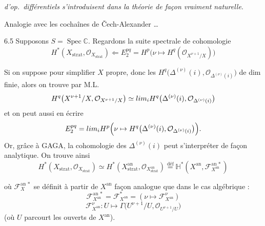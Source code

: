 \documentclass[11pt,a4paper]{article}
\begin{document}



\emph{d'op.\ différentiels s'introduisent dans la théorie de façon
vraiment naturelle}.

Analogie avec les cochaînes de Čech-Alexander \ldots

6.5 Supposons $S = \operatorname{Spec} \mathbb{C}$. Regardons la suite
spectrale de cohomologie 
\[
  H^{*}(X_{\mathrm{strat}}, \mathcal{O}_{X_{\mathrm{strat}}})
  \Longleftarrow E_{2}^{pq} = H^{p}\bigl(\nu \mapsto
  H^{q}(\mathcal{O}_{X^{\nu+1}/X})\bigr)
\]

Si on suppose pour simplifier $X$ propre, donc les
$H^{q}\bigl(\Delta^{(\nu)}(i), \mathcal{O}_{\Delta^{(\nu)}(i)}\bigr)$ de
dim finie, alors on trouve par M.L.
\[
  H^{q}\bigl(X^{\nu+1}/X, \mathcal{O}_{X^{\nu+1}/X}\bigr)
  \simeq \varprojlim_{i} H^{q}\bigl(\Delta^{(\nu)}(i),
  \mathcal{O}_{\Delta^{(\nu)}(i)}\bigr)
\]
et on peut aussi en écrire
\[
  E_{2}^{pq} = \varprojlim_{i} H^{p}\Bigl(\nu \mapsto
  H^{q}\bigl(\Delta^{(\nu)}(i), \mathcal{O}_{\Delta^{(\nu)}(i)}\bigr)\Bigr) .
\]
Or, grâce à GAGA, la cohomologie des $\Delta^{(\nu)}(i)$ peut
s'interpréter de façon analytique. On trouve ainsi
\[
  H^{*}(X_{\mathrm{strat}}, \mathcal{O}_{X_{\mathrm{strat}}})
  \simeq H^{*}(X^{\mathrm{an}}_{\mathrm{strat}},
  \mathcal{O}_{X^{\mathrm{an}}_{\mathrm{strat}}})
  \overset{\mathrm{déf}}{=}
  \mathbb{H}^{*}(X^{\mathrm{an}}, \mathcal{F}^{\mathrm{an}\,*}_{X^{\mathrm{an}}})
\]


où $\mathcal{F}^{\mathrm{an}\,*}_{X}$ se \struck{\ill{}} définit à partir
de $X^{\mathrm{an}}$   façon analogue que dans le cas
algébrique :
\[
  \mathcal{F}^{\mathrm{an}\,*}_{X^{\mathrm{an}}}
  = \mathcal{F}^{*}_{X^{\mathrm{an}}}
  = (\nu \mapsto \mathcal{F}^{\nu}_{X^{\mathrm{an}}})
\]
\[
  \mathcal{F}^{\nu}_{X^{\mathrm{an}}} : U \longmapsto
  \Gamma\bigl(U^{\nu+1}/U, \mathcal{O}_{U^{\nu+1}/U}\bigr)
\]
(où $U$ parcourt les ouverts de $X^{\mathrm{an}}$).
\end{document}
